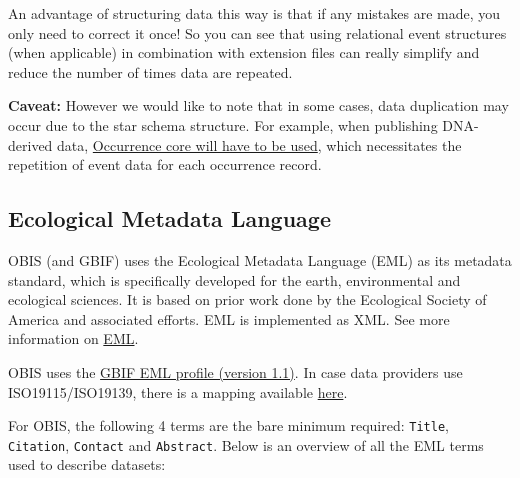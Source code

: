 \documentclass[
  letterpaper,
  DIV=11,
  numbers=noendperiod,
  oneside]{scrreprt}
\begin{document}
An advantage of structuring data this way is that if any mistakes are
made, you only need to correct it once! So you can see that using
relational event structures (when applicable) in combination with
extension files can really simplify and reduce the number of times data
are repeated.

\textbf{Caveat:} However we would like to note that in some cases, data
duplication may occur due to the star schema structure. For example,
when publishing DNA-derived data,
\href{https://docs.gbif.org/publishing-dna-derived-data/1.0/en/\#data-packaging-and-mapping}{Occurrence
core will have to be used}, which necessitates the repetition of event
data for each occurrence record.

\hypertarget{ecological-metadata-language}{%
\subsection{Ecological Metadata
Language}\label{ecological-metadata-language}}

OBIS (and GBIF) uses the Ecological Metadata Language (EML) as its
metadata standard, which is specifically developed for the earth,
environmental and ecological sciences. It is based on prior work done by
the Ecological Society of America and associated efforts. EML is
implemented as XML. See more information on
\href{https://eml.ecoinformatics.org/}{EML}.

OBIS uses the
\href{http://rs.gbif.org/schema/eml-gbif-profile/1.1/eml-gbif-profile.xsd}{GBIF
EML profile (version 1.1)}. In case data providers use
ISO19115/ISO19139, there is a mapping available
\href{http://rs.gbif.org/schema/eml-gbif-profile/1.1/eml2iso19139.xsl}{here}.

For OBIS, the following 4 terms are the bare minimum required:
\texttt{Title}, \texttt{Citation}, \texttt{Contact} and
\texttt{Abstract}. Below is an overview of all the EML terms used to
describe datasets:
\end{document}
